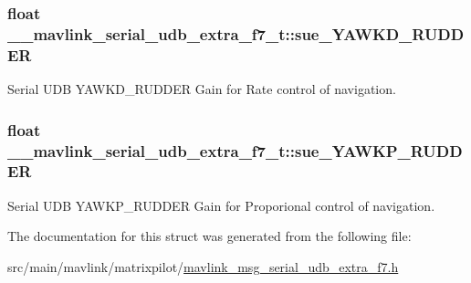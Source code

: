 \hypertarget{struct____mavlink__serial__udb__extra__f7__t_a96d3ced36cc13148d218ced6828fc835}{
\subsubsection[{sue\+\_\+\+Y\+A\+W\+K\+D\+\_\+\+R\+U\+D\+D\+E\+R}]{\setlength{\rightskip}{0pt plus 5cm}float \+\_\+\+\_\+mavlink\+\_\+serial\+\_\+udb\+\_\+extra\+\_\+f7\+\_\+t\+::sue\+\_\+\+Y\+A\+W\+K\+D\+\_\+\+R\+U\+D\+D\+E\+R}}\label{struct____mavlink__serial__udb__extra__f7__t_a96d3ced36cc13148d218ced6828fc835}


Serial U\+D\+B Y\+A\+W\+K\+D\+\_\+\+R\+U\+D\+D\+E\+R Gain for Rate control of navigation. 

\hypertarget{struct____mavlink__serial__udb__extra__f7__t_ab5c2a16ffdad061b0d3aed30683b714d}{
\subsubsection[{sue\+\_\+\+Y\+A\+W\+K\+P\+\_\+\+R\+U\+D\+D\+E\+R}]{\setlength{\rightskip}{0pt plus 5cm}float \+\_\+\+\_\+mavlink\+\_\+serial\+\_\+udb\+\_\+extra\+\_\+f7\+\_\+t\+::sue\+\_\+\+Y\+A\+W\+K\+P\+\_\+\+R\+U\+D\+D\+E\+R}}\label{struct____mavlink__serial__udb__extra__f7__t_ab5c2a16ffdad061b0d3aed30683b714d}


Serial U\+D\+B Y\+A\+W\+K\+P\+\_\+\+R\+U\+D\+D\+E\+R Gain for Proporional control of navigation. 



The documentation for this struct was generated from the following file\+:\begin{DoxyCompactItemize}
\item 
src/main/mavlink/matrixpilot/\hyperlink{mavlink__msg__serial__udb__extra__f7_8h}{mavlink\+\_\+msg\+\_\+serial\+\_\+udb\+\_\+extra\+\_\+f7.\+h}\end{DoxyCompactItemize}

